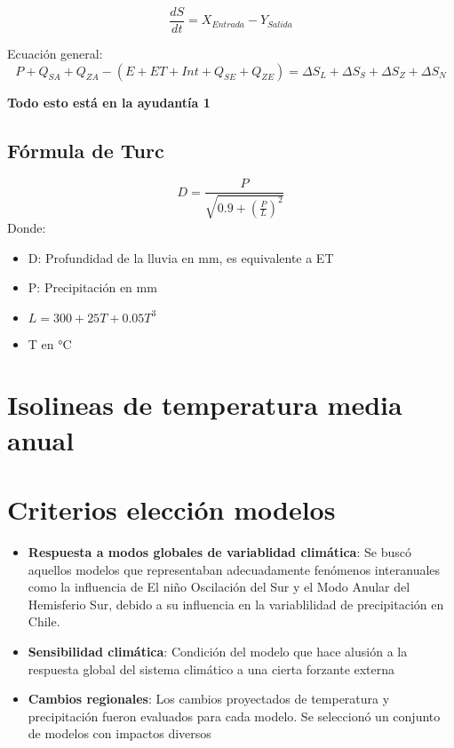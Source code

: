 \begin{equation}
    \frac{dS}{dt} = X_{Entrada} - Y_{Salida}
\end{equation}

Ecuación general:
\begin{equation}
    P + Q_{SA} + Q_{ZA} - (E + ET + Int + Q_{SE} + Q_{ZE}) = \Delta S_L + \Delta S_S + \Delta S_Z + \Delta S_N
\end{equation}

\textbf{Todo esto está en la ayudantía 1}

\subsection{Fórmula de Turc}
\begin{equation}
    D = \frac{P}{\sqrt{0.9+(\frac{P}{L})^2}}
\end{equation}
Donde:
\begin{itemize}
    \item D: Profundidad de la lluvia en mm, es equivalente a ET
    \item P: Precipitación en mm
    \item $L= 300 +25T +0.05T^3$
    \item T en °C
\end{itemize}

\section{Isolineas de temperatura media anual}

\section{Criterios elección modelos}
\begin{itemize}
    \item \textbf{Respuesta a modos globales de variablidad climática}: Se buscó aquellos modelos que representaban adecuadamente fenómenos interanuales como la influencia de El niño Oscilación del Sur y el Modo Anular del Hemisferio Sur, debido a su influencia en la variablilidad de precipitación en Chile.
    \item \textbf{Sensibilidad climática}: Condición del modelo que hace alusión a la respuesta global del sistema climático a una cierta forzante externa
    \item \textbf{Cambios regionales}: Los cambios proyectados de temperatura y precipitación fueron evaluados para cada modelo. Se seleccionó un conjunto de modelos con impactos diversos
\end{itemize}

